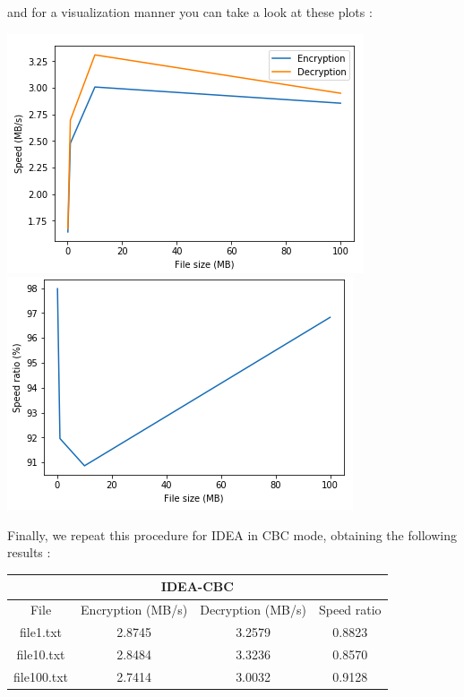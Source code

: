 \documentclass[11pt]{article}
\begin{document}
and for a visualization manner you can take a look at these plots :
\begin{center}
\includegraphics[scale=0.45]{./enc_dec_speed_idea_ecb.png}
\includegraphics[scale=0.45]{./avg_speed_ratio_idea_ecb.png}
\end{center}
Finally, we repeat this procedure for IDEA in CBC mode, obtaining the following results :
\begin{center}
\begin{tabular}{| c | c | c | c |}
\hline
\multicolumn{4}{|c|}{IDEA-CBC} \\
\hline
File & Encryption (MB/s) & Decryption (MB/s) & Speed ratio\\
\hline
file1.txt & 2.8745 & 3.2579 & 0.8823 \\
\hline
file10.txt & 2.8484 & 3.3236 & 0.8570 \\
\hline
file100.txt & 2.7414 & 3.0032 & 0.9128 \\
\hline
\end{tabular}
\end{center}
\end{document}
